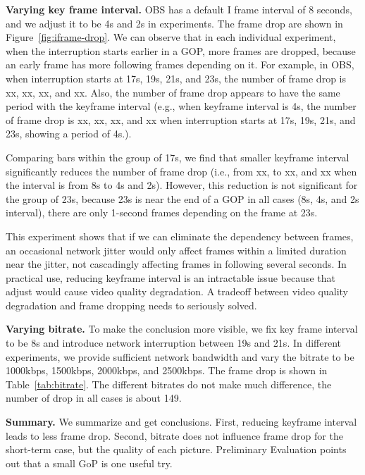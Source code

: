 
\textbf{Varying key frame interval.} OBS has a default I frame interval of 8 seconds, and we adjust it to be 4s and 2s in experiments. The frame drop are shown in Figure~\ref{fig:iframe-drop}. We can observe that in each individual experiment, when the interruption starts earlier in a GOP, more frames are dropped, because an early frame has more following frames depending on it. For example, in OBS, when interruption starts at 17s, 19s, 21s, and 23s, the number of frame drop is xx, xx, xx, and xx.
Also, the number of frame drop appears to have the same period with the keyframe interval (e.g., when keyframe interval is 4s, the number of frame drop is xx, xx, xx, and xx when interruption starts at 17s, 19s, 21s, and 23s, showing a period of 4s.).

Comparing bars within the group of 17s, we find that smaller keyframe interval significantly reduces the number of frame drop (i.e., from xx, to xx, and xx when the interval is from 8s to 4s and 2s). However, this reduction is not significant for the group of 23s, because 23s is near the end of a GOP in all cases (8s, 4s, and 2s interval), there are only 1-second frames depending on the frame at 23s.

This experiment shows that if we can eliminate the dependency between frames, an occasional network jitter would only affect frames within a limited duration near the jitter, not cascadingly affecting frames in following several seconds. In practical use, reducing keyframe interval is an intractable issue because that adjust would cause video quality degradation. A tradeoff between video quality degradation and frame dropping needs to seriously solved.


\textbf{Varying bitrate.}
To make the conclusion more visible, we fix key frame interval to be 8s and introduce network interruption between 19s and 21s. In different experiments, we provide sufficient network bandwidth and vary the bitrate to be 1000kbps, 1500kbps, 2000kbps, and 2500kbps. The frame drop is shown in Table~\ref{tab:bitrate}. The different bitrates do not make much difference, the number of drop in all cases is about 149.

\textbf{Summary.} We summarize and get conclusions. First, reducing keyframe interval leads to less frame drop. Second, bitrate does not influence frame drop for the short-term case, but the quality of each picture. Preliminary Evaluation points out that a small GoP is one useful try.
